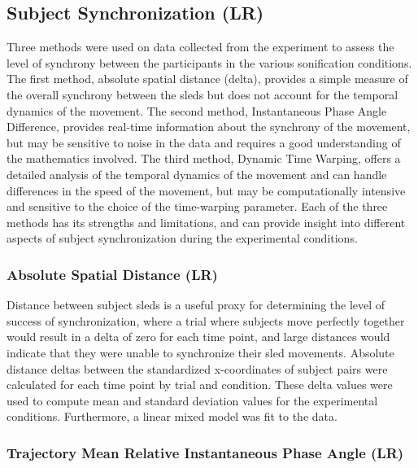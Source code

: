 \documentclass[10pt,a4paper,onecolumn]{article}
\begin{document}
\hypertarget{subject-synchronization-lr}{%
\subsection{Subject Synchronization (LR)}\label{subject-synchronization-lr}}

Three methods were used on data collected from the experiment to assess the level of synchrony between the participants in the various sonification conditions. The first method, absolute spatial distance (delta), provides a simple measure of the overall synchrony between the sleds but does not account for the temporal dynamics of the movement. The second method, Instantaneous Phase Angle Difference, provides real-time information about the synchrony of the movement, but may be sensitive to noise in the data and requires a good understanding of the mathematics involved. The third method, Dynamic Time Warping, offers a detailed analysis of the temporal dynamics of the movement and can handle differences in the speed of the movement, but may be computationally intensive and sensitive to the choice of the time-warping parameter. Each of the three methods has its strengths and limitations, and can provide insight into different aspects of subject synchronization during the experimental conditions.

\hypertarget{absolute-spatial-distance-lr}{%
\subsubsection{Absolute Spatial Distance (LR)}\label{absolute-spatial-distance-lr}}

Distance between subject sleds is a useful proxy for determining the level of success of synchronization, where a trial where subjects move perfectly together would result in a delta of zero for each time point, and large distances would indicate that they were unable to synchronize their sled movements. Absolute distance deltas between the standardized x-coordinates of subject pairs were calculated for each time point by trial and condition. These delta values were used to compute mean and standard deviation values for the experimental conditions. Furthermore, a linear mixed model was fit to the data.

\hypertarget{trajectory-mean-relative-instantaneous-phase-angle-lr}{%
\subsubsection{Trajectory Mean Relative Instantaneous Phase Angle (LR)}\label{trajectory-mean-relative-instantaneous-phase-angle-lr}}
\end{document}
